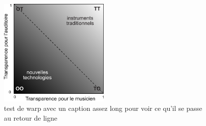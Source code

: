 \begin{figure}
	\captionsetup{format =plain}%
  \begin{center}
    \includegraphics[width=0.48\textwidth]{gfx/03_gesture/Fels-transparency.pdf}
  \end{center}
  \caption{test de warp avec un caption assez long pour voir ce qu'il se passe au retour de ligne}
\end{figure}

\blindtext
\blindtext
